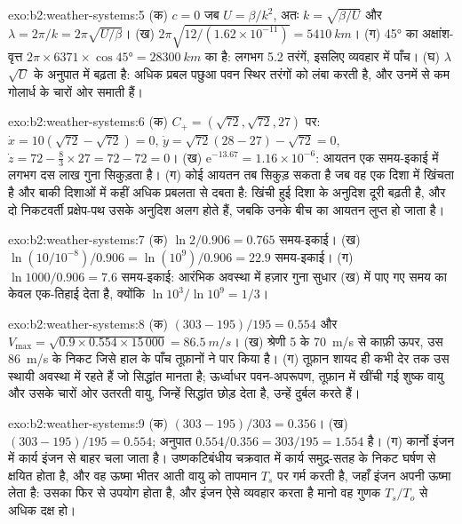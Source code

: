\begin{solution}{exo:b2:weather-systems:5}
(क) $c = 0$ जब $U = \beta/k^2$, अतः $k = \sqrt{\beta/U}$ और $\lambda = 2\pi/k =
2\pi\sqrt{U/\beta}$। (ख) $2\pi\sqrt{12/(1.62 \times 10^{-11})} = \qty{5410}{km}$। (ग) \ang{45} का
अक्षांश-वृत्त $2\pi \times 6371 \times \cos\ang{45} = \qty{28300}{km}$ का है: लगभग 5.2
तरंगें, इसलिए व्यवहार में पाँच। (घ) $\lambda$ $\sqrt U$ के अनुपात में बढ़ता है: अधिक प्रबल पछुआ पवन
स्थिर तरंगों को लंबा करती है, और उनमें से कम गोलार्ध के चारों ओर समाती हैं।
\end{solution}

\begin{solution}{exo:b2:weather-systems:6}
(क) $C_+ = (\sqrt{72}, \sqrt{72}, 27)$ पर: $\dot x = 10(\sqrt{72} - \sqrt{72}) = 0$, $\dot y =
\sqrt{72}(28 - 27) - \sqrt{72} = 0$, $\dot z = 72 - \tfrac83 \times 27 = 72 - 72 = 0$।
(ख) $\mathrm{e}^{-13.67} = 1.16 \times 10^{-6}$: आयतन एक समय-इकाई में लगभग दस लाख गुना
सिकुड़ता है। (ग) कोई आयतन तब सिकुड़ सकता है जब वह एक दिशा में खिंचता है और बाकी दिशाओं में कहीं अधिक
प्रबलता से दबता है: खिंची हुई दिशा के अनुदिश दूरी बढ़ती है, और दो निकटवर्ती
प्रक्षेप-पथ उसके अनुदिश अलग होते हैं, जबकि उनके बीच का आयतन लुप्त हो जाता है।
\end{solution}

\begin{solution}{exo:b2:weather-systems:7}
(क) $\ln 2/0.906 = 0.765$ समय-इकाई। (ख) $\ln(10/10^{-8})/0.906 = \ln(10^9)/0.906 = 22.9$
समय-इकाई। (ग) $\ln 1000/0.906 = 7.6$ समय-इकाई: आरंभिक अवस्था में हज़ार गुना सुधार
(ख) में पाए गए समय का केवल एक-तिहाई देता है, क्योंकि $\ln 10^3/\ln 10^9 = 1/3$।
\end{solution}

\begin{solution}{exo:b2:weather-systems:8}
(क) $(303 - 195)/195 = 0.554$ और $V_{\max} = \sqrt{0.9 \times 0.554 \times 15\,000} =
\qty{86.5}{m/s}$। (ख) श्रेणी 5 के \qty{70}{m/s} से काफ़ी ऊपर, उस \qty{86}{m/s} के निकट जिसे
हाल के पाँच तूफ़ानों ने पार किया है। (ग) तूफ़ान शायद ही कभी देर तक उस स्थायी अवस्था में रहते हैं जो सिद्धांत
मानता है; ऊर्ध्वाधर पवन-अपरूपण, तूफ़ान में खींची गई शुष्क वायु और उसके चारों ओर उतरती वायु, जिन्हें
सिद्धांत छोड़ देता है, उन्हें दुर्बल करते हैं।
\end{solution}

\begin{solution}{exo:b2:weather-systems:9}
(क) $(303 - 195)/303 = 0.356$। (ख) $(303 - 195)/195 = 0.554$; अनुपात $0.554/0.356 =
303/195 = 1.554$ है। (ग) कार्नो इंजन में कार्य इंजन से बाहर चला जाता है। उष्णकटिबंधीय चक्रवात में
कार्य समुद्र-सतह के निकट घर्षण से क्षयित होता है, और वह ऊष्मा भीतर आती वायु को
तापमान $T_s$ पर गर्म करती है, जहाँ इंजन अपनी ऊष्मा लेता है: उसका फिर से उपयोग होता है, और इंजन ऐसे व्यवहार करता है
मानो वह गुणक $T_s/T_o$ से अधिक दक्ष हो।
\end{solution}

